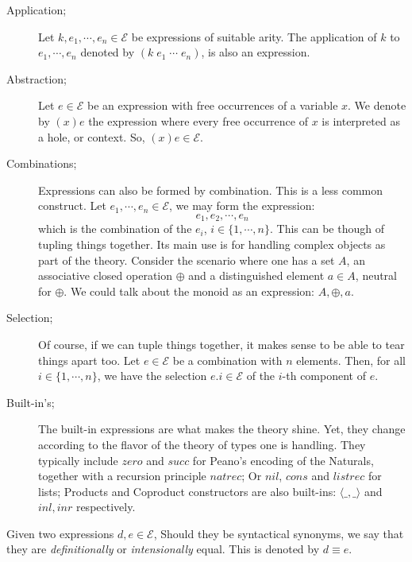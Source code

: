 \begin{mydef}[Expressions]\hfill
\begin{description}
  \item[Application;]
    Let $k, e_1, \cdots, e_n \in \mathcal{E}$ be expressions of suitable arity. The application of $k$ to $e_1, \cdots, e_n$ denoted by $(k\;e_1\;\cdots\;e_n)$,
    is also an expression.
  
  \item[Abstraction;]
    Let $e \in \mathcal{E}$ be an expression with free occurrences of a variable $x$.
    We denote by $(x)e$ the expression where every free occurrence of $x$ is
    interpreted as a hole, or context. So, $(x)e \in \mathcal{E}$.
  
  \item[Combinations;]
    Expressions can also be formed by combination. This is a less common construct.
    Let $e_1, \cdots, e_n \in \mathcal{E}$, we may form the expression:
    \[
      e_1,e_2,\cdots,e_n
    \]
    which is the combination of the $e_i$, $i \in \{1,\cdots,n\}$. 
    This can be though of tupling things together. Its main use is for
    handling complex objects as part of the theory. Consider the
    scenario where one has a set $A$, an associative closed operation $\oplus$ and
    a distinguished element $a \in A$, neutral for $\oplus$. We could talk
    about the monoid as an expression: $A, \oplus, a$.
  
  \item[Selection;]
    Of course, if we can tuple things together, it makes sense to be able to
    tear things apart too. Let $e\in\mathcal{E}$ be a combination with
    $n$ elements. Then, for all $i \in \{1, \cdots, n\}$, we have the
    selection $e.i \in \mathcal{E}$ of the $i$-th component of $e$.
  
  \item[Built-in's;]
    The built-in expressions are what makes the theory shine. Yet, 
    they change according to the flavor of the theory of types one is handling.
    They typically include $zero$ and $succ$ for Peano's encoding of the Naturals, 
    together with a recursion principle $natrec$; Or $nil$, $cons$ and $listrec$
    for lists; Products and Coproduct constructors are also built-ins: $\langle\_,\_\rangle$
    and $inl, inr$ respectively.
\end{description}
\end{mydef}\hfill

\begin{mydef}
Given two expressions $d, e \in \mathcal{E}$, Should they be syntactical synonyms, we say
that they are \emph{definitionally} or \emph{intensionally} equal. This is denoted
by $d \equiv e$.
\end{mydef}

